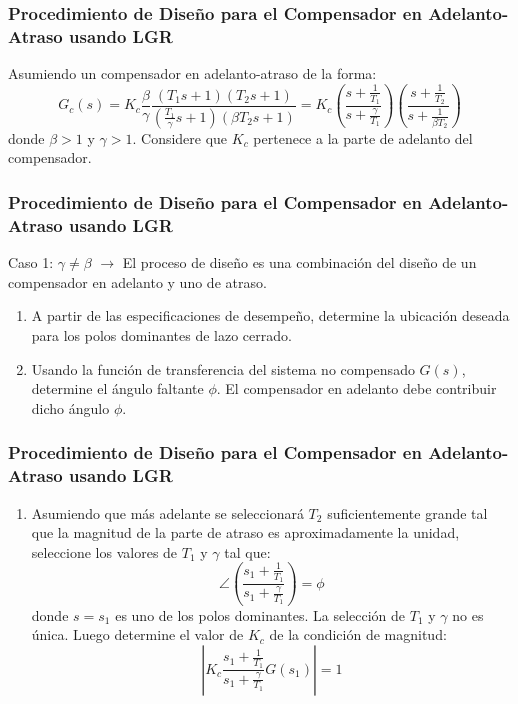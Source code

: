 \documentclass[aspectratio=169,handout]{beamer}
\theoremstyle{definition}
\theoremstyle{plain}
\theoremstyle{remark}
\newcounter{saveenumi}
\newcommand{\seti}{\setcounter{saveenumi}{\value{enumi}}}
\newcommand{\conti}{\setcounter{enumi}{\value{saveenumi}}}
\begin{document}
\begin{frame}[<+->]\frametitle{Procedimiento de Diseño para el Compensador en Adelanto-Atraso usando LGR}
	Asumiendo un compensador en adelanto-atraso de la forma:
	\begin{equation*}
		G_c(s) = K_c \frac{\beta}{\gamma} \frac{(T_1 s + 1)(T_2 s + 1)}{(\frac{T_1}{\gamma} s + 1)(\beta T_2 s + 1)} = K_c \left( \frac{s+\frac{1}{T_1}}{s+\frac{\gamma}{T_1}} \right)\left( \frac{s+\frac{1}{T_2}}{s+\frac{1}{\beta T_2}} \right)
	\end{equation*}
	donde $\beta > 1$ y $\gamma > 1$. Considere que $K_c$ pertenece a la parte de adelanto del compensador.
\end{frame}

\begin{frame}[<+->]\frametitle{Procedimiento de Diseño para el Compensador en Adelanto-Atraso usando LGR}
\small
Caso 1: $\gamma \neq \beta$ $\rightarrow$ El proceso de diseño es una combinación del diseño de un compensador en adelanto y uno de atraso.
\pause
	\begin{enumerate}
		\item A partir de las especificaciones de desempeño, determine la ubicación deseada para los polos dominantes de lazo cerrado.
		\item Usando la función de transferencia del sistema no compensado $G(s)$, determine el ángulo faltante $\phi$. El compensador en adelanto debe contribuir dicho ángulo $\phi$.
		\seti
	\end{enumerate}
\end{frame}

\begin{frame}[<+->]\frametitle{Procedimiento de Diseño para el Compensador en Adelanto-Atraso usando LGR}
\small
	\begin{enumerate}
		\conti
		\item Asumiendo que más adelante se seleccionará $T_2$ suficientemente grande tal que la magnitud de la parte de atraso es aproximadamente la unidad, seleccione los valores de $T_1$ y $\gamma$ tal que:
		\begin{equation*}
			\angle\left(\frac{s_1+\frac{1}{T_1}}{s_1+\frac{\gamma}{T_1}} \right) = \phi
		\end{equation*}
		donde $s = s_1$ es uno de los polos dominantes. La selección de $T_1$ y $\gamma$ no es única.
		\pause
		Luego determine el valor de $K_c$ de la condición de magnitud:
		\begin{equation*}
			\left| K_c \frac{s_1+\frac{1}{T_1}}{s_1+\frac{\gamma}{T_1}} G(s_1) \right| = 1
		\end{equation*}
		\seti
	\end{enumerate}
\end{frame}
\end{document}
